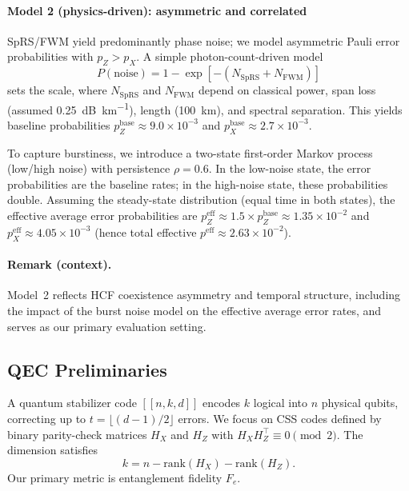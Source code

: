 \paragraph*{Model 2 (physics-driven): asymmetric and correlated}
SpRS/FWM yield predominantly phase noise; we model asymmetric Pauli error probabilities with \(p_Z\!>\!p_X\). A simple photon-count-driven model
\begin{equation}
P(\mathrm{noise})=1-\exp[-(N_{\mathrm{SpRS}}+N_{\mathrm{FWM}})]
\end{equation}
sets the scale, where \(N_{\mathrm{SpRS}}\) and \(N_{\mathrm{FWM}}\) depend on classical power, span loss (assumed \SI{0.25}{\dB\per\kilo\meter}), length (\SI{100}{\kilo\meter}), and spectral separation. This yields baseline probabilities \(p_Z^{\mathrm{base}}\approx9.0\times10^{-3}\) and \(p_X^{\mathrm{base}}\approx2.7\times10^{-3}\).

To capture burstiness, we introduce a two-state first-order Markov process (low/high noise) with persistence \(\rho=0.6\). In the low-noise state, the error probabilities are the baseline rates; in the high-noise state, these probabilities double. Assuming the steady-state distribution (equal time in both states), the effective average error probabilities are \(p_Z^{\mathrm{eff}} \approx 1.5 \times p_Z^{\mathrm{base}} \approx 1.35\times10^{-2}\) and \(p_X^{\mathrm{eff}} \approx 4.05\times10^{-3}\) (hence total effective \(p^{\mathrm{eff}}\approx2.63\times10^{-2}\)).

\paragraph*{Remark (context).}
Model~2 reflects HCF coexistence asymmetry and temporal structure, including the impact of the burst noise model on the effective average error rates, and serves as our primary evaluation setting.

\subsection{QEC Preliminaries}
A quantum stabilizer code \( [[n,k,d]] \) encodes \(k\) logical into \(n\) physical qubits, correcting up to \(t=\lfloor(d-1)/2\rfloor\) errors. We focus on CSS codes defined by binary parity-check matrices \(H_X\) and \(H_Z\) with \(H_X H_Z^\top\equiv 0 \pmod{2}\). The dimension satisfies
\begin{equation}
k = n - \mathrm{rank}(H_X) - \mathrm{rank}(H_Z).
\end{equation}
Our primary metric is entanglement fidelity \(F_e\).


